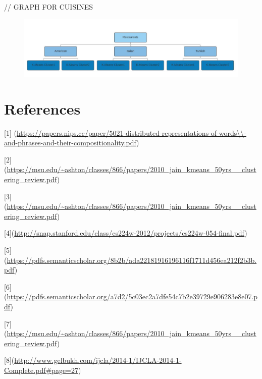 \documentclass{article} %
\begin{document}
// GRAPH FOR CUISINES


\begin{center}
\begin{figure}
  \includegraphics[width=\linewidth]{tablo.png}
\end{figure}
\end{center}

\section{References}

[1] (\url{https://papers.nips.cc/paper/5021-distributed-representations-of-words\\-and-phrases-and-their-compositionality.pdf}) 

[2] (\url{https://msu.edu/~ashton/classes/866/papers/2010_jain_kmeans_50yrs__clustering_review.pdf}) 

[3] (\url{https://msu.edu/~ashton/classes/866/papers/2010_jain_kmeans_50yrs__clustering_review.pdf}) 


[4](\url{http://snap.stanford.edu/class/cs224w-2012/projects/cs224w-054-final.pdf})
 

[5](\url{https://pdfs.semanticscholar.org/8b2b/ada22181916196116f1711d456ea212f2b3b.pdf})



[6](\url{https://pdfs.semanticscholar.org/a7d2/5c03ec2a7dfe54c7b2e39729e906283e8e07.pdf})


[7](\url{https://msu.edu/~ashton/classes/866/papers/2010_jain_kmeans_50yrs__clustering_review.pdf}) 


[8](\url{http://www.gelbukh.com/ijcla/2014-1/IJCLA-2014-1-Complete.pdf#page=27})
\end{document}
